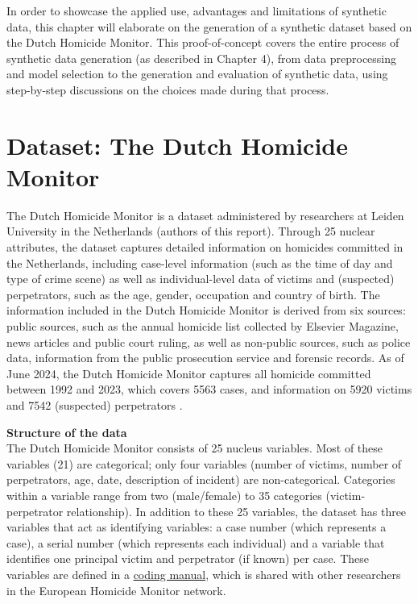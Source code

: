 
\label{proofofconcept}

In order to showcase the applied use, advantages and limitations of synthetic data, this chapter will elaborate on the generation of a synthetic dataset based on the Dutch Homicide Monitor. This proof-of-concept covers the entire process of synthetic data generation (as described in Chapter 4), from data preprocessing and model selection to the generation and evaluation of synthetic data, using step-by-step discussions on the choices made during that process. 

\section{Dataset: The Dutch Homicide Monitor}

The Dutch Homicide Monitor is a dataset administered by researchers at Leiden University in the Netherlands (authors of this report). Through 25 nuclear attributes, the dataset captures detailed information on homicides committed in the Netherlands, including case-level information (such as the time of day and type of crime scene) as well as individual-level data of victims and (suspected) perpetrators, such as the age, gender, occupation and country of birth. The information included in the Dutch Homicide Monitor is derived from six sources: public sources, such as the annual homicide list collected by Elsevier Magazine, news articles and public court ruling, as well as non-public sources, such as police data, information from the public prosecution service and forensic records. As of June 2024, the Dutch Homicide Monitor captures all homicide committed between 1992 and 2023, which covers 5563 cases, and information on 5920 victims and 7542 (suspected) perpetrators \cite{DHM}. 

\textbf{Structure of the data}\\
The Dutch Homicide Monitor consists of 25 nucleus variables. Most of these variables (21) are categorical; only four variables (number of victims, number of perpetrators, age, date, description of incident) are non-categorical. Categories within a variable range from two (male/female) to 35 categories (victim-perpetrator relationship). In addition to these 25 variables, the dataset has three variables that act as identifying variables: a case number (which represents a case), a serial number (which represents each individual) and a variable that identifies one principal victim and perpetrator (if known) per case. These variables are defined in a \href{https://www.universiteitleiden.nl/binaries/content/assets/governance-and-global-affairs/isga/dfvm---coding-manual-marieke-liem.pdf}{coding manual}, which is shared with other researchers in the European Homicide Monitor network. 

